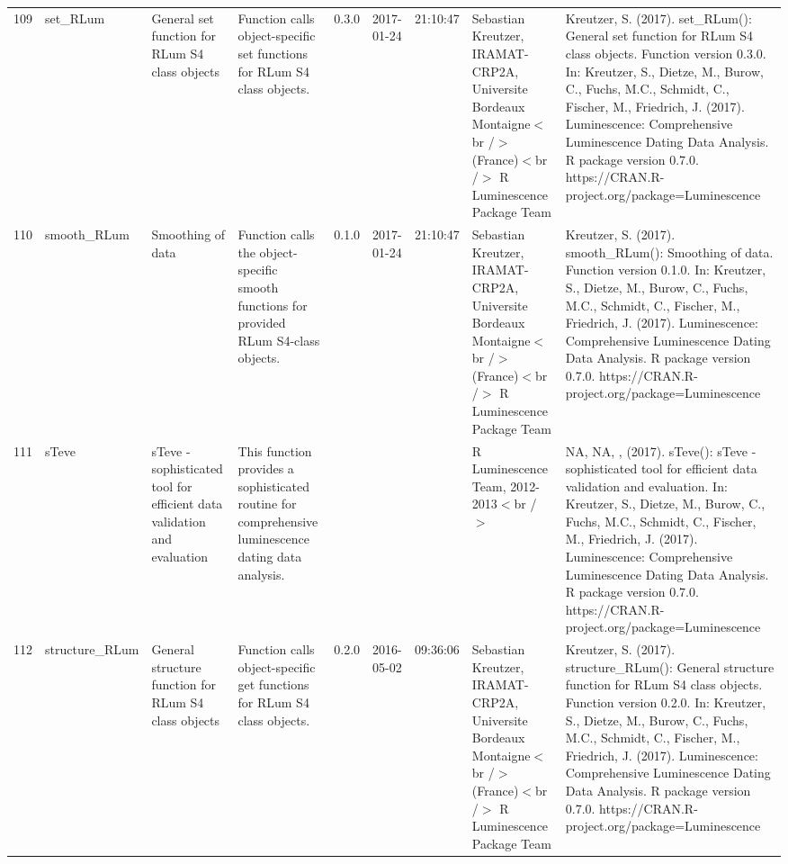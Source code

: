 \begin{table}[ht]
\begin{tabular}{rllllllll}
 \\ 
  109 & set\_RLum & General set function for RLum S4 class objects & Function calls object-specific set functions for RLum S4 class objects. & 0.3.0 & 2017-01-24 & 21:10:47
 & Sebastian Kreutzer, IRAMAT-CRP2A, Universite Bordeaux Montaigne$<$br /$>$ (France)$<$br /$>$  R Luminescence Package Team & Kreutzer, S. (2017). set\_RLum(): General set function for RLum S4 class objects. Function version 0.3.0. In: Kreutzer, S., Dietze, M., Burow, C., Fuchs, M.C., Schmidt, C., Fischer, M., Friedrich, J. (2017). Luminescence: Comprehensive Luminescence Dating Data Analysis. R package version 0.7.0. https://CRAN.R-project.org/package=Luminescence
 \\ 
  110 & smooth\_RLum & Smoothing of data & Function calls the object-specific smooth functions for provided RLum S4-class objects. & 0.1.0 & 2017-01-24 & 21:10:47
 & Sebastian Kreutzer, IRAMAT-CRP2A, Universite Bordeaux Montaigne$<$br /$>$ (France)$<$br /$>$  R Luminescence Package Team & Kreutzer, S. (2017). smooth\_RLum(): Smoothing of data. Function version 0.1.0. In: Kreutzer, S., Dietze, M., Burow, C., Fuchs, M.C., Schmidt, C., Fischer, M., Friedrich, J. (2017). Luminescence: Comprehensive Luminescence Dating Data Analysis. R package version 0.7.0. https://CRAN.R-project.org/package=Luminescence
 \\ 
  111 & sTeve & sTeve - sophisticated tool for efficient data validation and evaluation & This function provides a sophisticated routine for comprehensive luminescence dating data analysis. &  &  &  & R Luminescence Team, 2012-2013$<$br /$>$ & NA, NA, ,  (2017). sTeve(): sTeve - sophisticated tool for efficient data validation and evaluation. In: Kreutzer, S., Dietze, M., Burow, C., Fuchs, M.C., Schmidt, C., Fischer, M., Friedrich, J. (2017). Luminescence: Comprehensive Luminescence Dating Data Analysis. R package version 0.7.0. https://CRAN.R-project.org/package=Luminescence
 \\ 
  112 & structure\_RLum & General structure function for RLum S4 class objects & Function calls object-specific get functions for RLum S4 class objects. & 0.2.0 & 2016-05-02 & 09:36:06
 & Sebastian Kreutzer, IRAMAT-CRP2A, Universite Bordeaux Montaigne$<$br /$>$ (France)$<$br /$>$  R Luminescence Package Team & Kreutzer, S. (2017). structure\_RLum(): General structure function for RLum S4 class objects. Function version 0.2.0. In: Kreutzer, S., Dietze, M., Burow, C., Fuchs, M.C., Schmidt, C., Fischer, M., Friedrich, J. (2017). Luminescence: Comprehensive Luminescence Dating Data Analysis. R package version 0.7.0. https://CRAN.R-project.org/package=Luminescence

\end{tabular}
\end{table}

